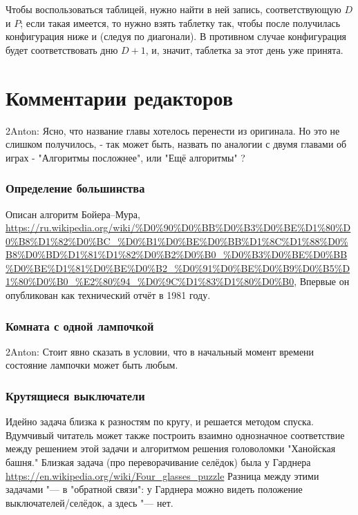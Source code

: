 \documentclass[twoside]{book}
\begin{document}

Чтобы воспользоваться таблицей, нужно найти в ней запись, соответствующую $D$ и $P$;
если такая имеется, то нужно взять таблетку так, чтобы после получилась конфигурация ниже и  (следуя по диагонали).
В противном случае конфигурация будет соответствовать дню $D+1$, и, значит, таблетка за этот день уже принята.

\section*{Комментарии редакторов}

2Anton: Ясно, что название главы хотелось перенести из оригинала.
Но это не слишком получилось, - так может быть, назвать по аналогии 
с двумя главами об играх - "Алгоритмы посложнее", или "Ещё алгоритмы" ?

\subsubsection*{Определение большинства}
Описан алгоритм Бойера--Мура, \url{https://ru.wikipedia.org/wiki/%D0%90%D0%BB%D0%B3%D0%BE%D1%80%D0%B8%D1%82%D0%BC_%D0%B1%D0%BE%D0%BB%D1%8C%D1%88%D0%B8%D0%BD%D1%81%D1%82%D0%B2%D0%B0_%D0%B3%D0%BE%D0%BB%D0%BE%D1%81%D0%BE%D0%B2_%D0%91%D0%BE%D0%B9%D0%B5%D1%80%D0%B0_%E2%80%94_%D0%9C%D1%83%D1%80%D0%B0},
Впервые он опубликован как технический отчёт в 1981 году.


\subsubsection*{Комната с одной лампочкой}
2Anton: Стоит явно сказать в условии, что в начальный момент времени состояние лампочки может быть любым.

\subsubsection*{Крутящиеся выключатели}
Идейно задача близка к разностям по кругу, и решается методом спуска. Вдумчивый читатель может также построить взаимно однозначное соответствие между решением этой задачи и алгоритмом решения головоломки "Ханойская башня." 
Близкая задача (про переворачивание селёдок) была у Гарднера \url{https://en.wikipedia.org/wiki/Four_glasses_puzzle} 
Разница между этими задачами "--- в "обратной связи": у Гарднера можно видеть положение выключателей/селёдок, а здесь "--- нет. 
\end{document}
